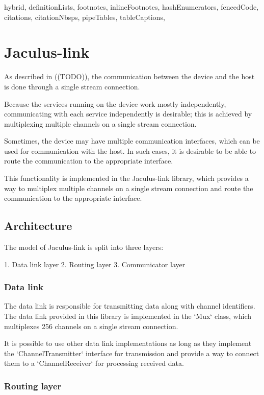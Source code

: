 \begin{markdown*}{%
  hybrid,
  definitionLists,
  footnotes,
  inlineFootnotes,
  hashEnumerators,
  fencedCode,
  citations,
  citationNbsps,
  pipeTables,
  tableCaptions,
}

\chapter{Jaculus-link}

As described in ((TODO)), the communication between the device and the host is done through a single stream connection.

Because the services running on the device work mostly independently, communicating with each service independently is desirable; this is achieved by multiplexing multiple channels on a single stream connection.

Sometimes, the device may have multiple communication interfaces, which can be used for communication with the host. In such cases, it is desirable to be able to route the communication to the appropriate interface.

This functionality is implemented in the Jaculus-link library, which provides a way to multiplex multiple channels on a single stream connection and route the communication to the appropriate interface.

\section{Architecture}

The model of Jaculus-link is split into three layers:

1. Data link layer
2. Routing layer
3. Communicator layer

\subsection{Data link}

The data link is responsible for transmitting data along with channel identifiers. The data link provided in this library is implemented in the `Mux` class, which multiplexes 256 channels on a single stream connection.

It is possible to use other data link implementations as long as they implement the `ChannelTransmitter` interface for transmission and provide a way to connect them to a `ChannelReceiver` for processing received data.

\subsection{Routing layer}


\end{markdown*}
